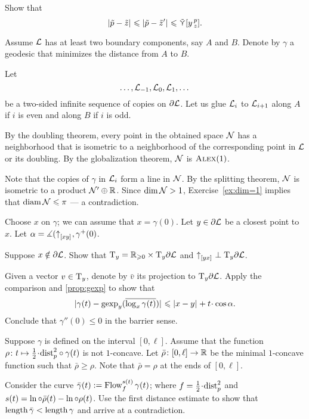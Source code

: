 Show that 
\[|{\tilde p}-{\tilde z}|_{}^{{}}\leqslant |{\tilde p}-{\tilde z'}|_{}^{{}}\leqslant\mathop{\tilde\curlyvee}\nolimits[y\,{}^{p}_{z}].\]


Assume $\mathcal{L}$ has at least two boundary components, say $A$ and $B$.
Denote by $\gamma$ a geodesic that minimizes the distance from $A$ to $B$.

Let 
\[\dots,\mathcal{L}_{-1},\mathcal{L}_{0},\mathcal{L}_{1},\dots\]
be a two-sided infinite sequence of copies on $\partial\mathcal{L}$.
Let us glue $\mathcal{L}_{i}$ to $\mathcal{L}_{i+1}$ along $A$ if $i$ is even and along $B$ if $i$ is odd.

By the doubling theorem, every point in the obtained space $\mathcal{N}$ has a neighborhood that is isometric to a neighborhood of the corresponding point in $\mathcal{L}$ or its doubling.
By the globalization theorem, $\mathcal{N}$ is $\textsc{Alex}(1)$.

Note that the copies of $\gamma$ in $\mathcal{L}_{i}$ form a line in $\mathcal{N}$.
By the splitting theorem, $\mathcal{N}$ is isometric to a product $\mathcal{N}'\oplus \mathbb{R}$.
Since $\operatorname{\rm dim}\nolimits\mathcal{N}>1$, Exercise~\ref{ex:dim=1} implies that $\operatorname{\rm diam}\nolimits\mathcal{N}\leqslant \pi$ --- a contradiction.

 Choose $x$ on $\gamma$;
we can assume that $x=\gamma(0)$.
Let $y\in \partial \mathcal{L}$ be a closest point to $x$.
Let $\alpha=\measuredangle({\uparrow}_{[{x}{y}]_{{}}},\gamma^+(0)$.

Suppose $x\notin \partial \mathcal{L}$.
Show that $\mathrm{T}_y=\mathbb{R}_{\geqslant0}\times\mathrm{T}_y\partial \mathcal{L}$
and ${\uparrow}_{[{y}{x}]_{{}}}\perp \mathrm{T}_y\partial \mathcal{L}$.

Given a vector $v\in \mathrm{T}_y$, denote by $\bar v$ its projection to $\mathrm{T}_y\partial \mathcal{L}$.
Apply the comparison and \ref{prop:gexp} to show that 
\[\dist{\gamma(t)}{\gexp_y(\overline{\log_x\gamma(t)})}{}\le \dist{x}{y}{}+t\cdot\cos\alpha.\]
Conclude that $\gamma''(0)\le 0$ in the barrier sense.


Suppose $\gamma$ is defined on the interval $[0,\ell]$.
Assume that the function $\rho\:t\mapsto \tfrac12\cdot\distfun_p^2\circ\gamma(t)$ is not $1$-concave.
Let $\bar\rho\colon[0,\ell]\to\mathbb{R}$ be the minimal $1$-concave function such that $\bar\rho\ge \rho$.
Note that $\bar\rho=\rho$ at the ends of $[0,\ell]$.

Consider the curve $\bar\gamma(t)\mathrel{:=} \mathop{\rm Flow}\nolimits_f^{s(t)}\gamma(t)$;
where $f=\tfrac12\cdot\distfun_p^2$ and $s(t)=\ln\circ\bar\rho(t)-\ln\circ\rho(t)$.
Use the first distance estimate to show that $\mathop{\rm length}\nolimits\bar\gamma<\mathop{\rm length}\nolimits\gamma$ and arrive at a contradiction.

